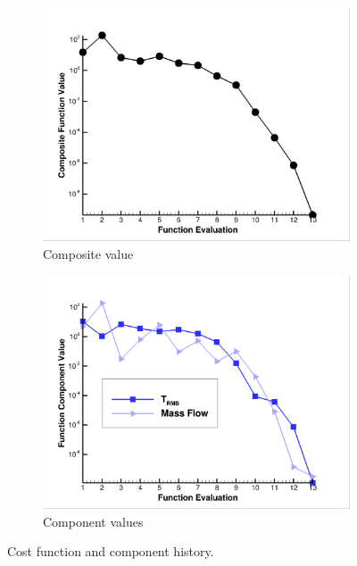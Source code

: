 \begin{figure}[h]
  \centering
	\begin{subfigure}[b]{0.45\textwidth}
    \centering
    \includegraphics[width=\textwidth]{figures/1st-H2/cost_func.png}
    \caption{Composite value}
    \label{fig:cost-func-1st-H2}
  \end{subfigure}
	\begin{subfigure}[b]{0.45\textwidth}
    \centering
    \includegraphics[width=\textwidth]{figures/1st-H2/func_components.png}
    \caption{Component values}
    \label{fig:components-1st-H2}
  \end{subfigure}
  \caption{Cost function and component history.}
\end{figure}
